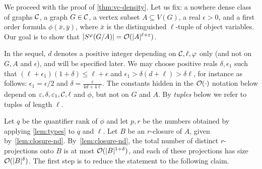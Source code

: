 We proceed with the proof of \autoref{thm:vc-density}.
%
 Let us fix: a nowhere dense class of graphs $\CCC$, a graph $G\in \CCC$, a vertex subset $A\subseteq V(G)$, a real $\epsilon>0$, and 
 a first order formula $\phi(\bar x,\bar y)$, where $\bar x$ is the distinguished $\ell$-tuple of object variables.
 Our goal is to show that $|S^\phi(G/A)|=\Oof(|A|^{\ell+\epsilon})$.
 	   
In the sequel, $d$ denotes a positive integer 
depending on ${\cal C},\ell,\phi$ only (and not on $G, A$ and $\epsilon$), and will be specified later. We may choose positive reals
$\delta,\epsilon_1$ such that 
	 $(\ell+\epsilon_1)(1+\delta) 
	 \le
	 \ell+\epsilon$ and $\epsilon_1>\delta(d+\ell)> \delta\ell$, for instance as follows: $\epsilon_1=\epsilon/2$ and $\delta=\frac{\epsilon}{4d+4\ell}$.
The constants hidden in the $\Oof(\cdot)$ notation below depend
 on $\epsilon,\delta,\epsilon_1,\cal C, \ell$ and $\phi$, but not on $G$ and $A$.   By \emph{tuples} below we refer to tuples of length $\ell$.

	Let $q$ be the quantifier rank of $\phi$ and let 
$p,r$ be the numbers obtained by applying \autoref{lem:types} to $q$ and $\ell$.
Let $B$ be an $r$-closure of $A$, given by~\autoref{lem:closure-nd}.
  By~\autoref{lem:closure-nd}, the total number of distinct $r$-projections onto $B$ 
  is at most $\Oof(|B|^{1+\delta})$, and each of these projections has size $\Oof(|B|^{\delta})$.
	\setcounter{claim}{0}
%	
The first step is to reduce the statement to the following claim.

